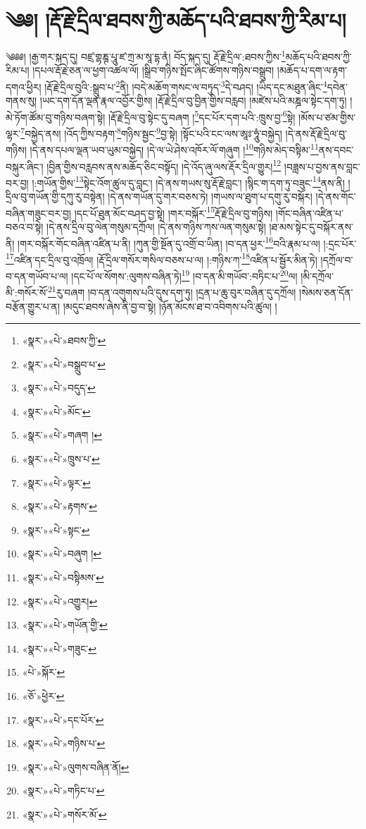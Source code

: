 \chapter{༄༅། །རྡོ་རྗེ་དྲིལ་ཐབས་ཀྱི་མཆོད་པའི་ཐབས་ཀྱི་རིམ་པ།}༄༅༅། །རྒྱ་གར་སྐད་དུ། བཛྲ་གྷཎྚ་པཱུ་ཛ་ཀྲ་མ་སཱ་དྷ་ནཾ། བོད་སྐད་དུ། རྡོ་རྗེ་དྲིལ་:ཐབས་ཀྱིས་\footnote{«སྣར་»«པེ་»ཐབས་ཀྱི་}མཆོད་པའི་ཐབས་ཀྱི་རིམ་པ། །དཔལ་རྡོ་རྗེ་ཅན་ལ་ཕྱག་འཚལ་ལོ། །སྒྲིབ་གཉིས་སྤོང་ཞིང་ཚོགས་གཉིས་བསྒྲུབ། །མཆོད་པ་དག་ལ་རྟག་དགའ་ཕྱིར། །རྡོ་རྗེ་དྲིལ་བུའི་:སྒྲུབ་པ་\footnote{«སྣར་»«པེ་»བསྒྲུབ་པ་}ནི། །བདེ་མཆོག་གསང་ལ་བཏུད་\footnote{«སྣར་»«པེ་»བདུད་}དེ་བཤད། །ཡིད་དང་མཐུན་ཞིང་\footnote{«སྣར་»«པེ་»མོང་}དབེན་གནས་སུ། །ཡང་དག་དོན་ལྡན་རྣལ་འབྱོར་གྱིས། །རྡོ་རྗེ་དྲིལ་བུ་བྱིན་གྱིས་བརླབ། །མཛེས་པའི་མཎྜལ་སྟེང་དག་ཏུ། །མེ་ཏོག་ཚོམ་བུ་གཉིས་བཞག་སྟེ། །རྡོ་རྗེ་དྲིལ་བུ་སྟེང་དུ་བཞག །\footnote{«སྣར་»«པེ་»གཞག །}དང་པོར་དག་པའི་:ཁྲུས་བྱ་\footnote{«སྣར་»«པེ་»ཁྲུས་པ་}སྟེ། །མོས་པ་ཙམ་གྱིས་ལྷར་\footnote{«སྣར་»«པེ་»ལྟར་}བསྐྱེད་ནས། །འོད་ཀྱིས་བརྟག་\footnote{«སྣར་»«པེ་»རྟགས་}གཉིས་སྦྱང་\footnote{«སྣར་»«པེ་»སྟང་}བྱ་སྟེ། །སྟོང་པའི་ངང་ལས་ཨཱཿ་ཧཱུཾ་བསྐྱེད། །དེ་ནས་རྡོ་རྗེ་དྲིལ་བུ་གཉིས། །དེ་ནས་དཔལ་ལྡན་ཡབ་ཡུམ་བསྐྱེད། །དེ་ལ་ཡེ་ཤེས་འཁོར་ལོ་གཞུག །\footnote{«སྣར་»«པེ་»བཞུག །}གཉིས་མེད་བསྟིམ་\footnote{«སྣར་»«པེ་»བསྟིམས་}ནས་དབང་བསྐུར་ཞིང་། །བྱིན་གྱིས་བརླབས་ནས་མཆོད་ཅིང་བསྟོད། །དེ་འོད་ཞུ་ལས་རྡོར་དྲིལ་གྱུར།\footnote{«སྣར་»«པེ་»འགྱུར།} །བཟླས་པ་བྱས་ནས་བླང་བར་བྱ། །:གཡོན་གྱིས་\footnote{«སྣར་»«པེ་»གཡོན་གྱི་}སྟེང་འོག་ཚུལ་དུ་བླང་། །དེ་ནས་གཡས་སུ་རྡོ་རྗེ་བླང་། །སྙིང་ག་དག་ཏུ་བཟུང་\footnote{«སྣར་»«པེ་»གཟུང་}ནས་ནི། །དྲིལ་བུ་གཡོན་གྱི་དཀུ་རུ་བསྟེན། །དེ་ནས་གཡོན་དུ་གར་བཅས་ཏེ། །གཡས་ལ་ཐུག་པ་དགུ་རུ་བསྐོར། །དེ་ནས་གོང་བཞིན་གཟུང་བར་བྱ། །དང་པོ་ཐུན་མོང་བཤད་བྱ་སྟེ། །གར་བསྐོར་\footnote{«པེ་»སྐོར་}རྡོ་རྗེ་དྲིལ་བུ་གཉིས། །གོང་བཞིན་འཛིན་པ་བཅའ་བ་སྟེ། །དེ་ནས་དྲིལ་བུ་ལེན་གསུམ་དཀྲོལ། །དེ་ནས་གཉིས་ཀས་ལན་གསུམ་སྟེ། །ཐ་མས་སྟེང་དུ་བསྐོར་ནས་ནི། །གར་བསྐོར་གོང་བཞིན་འཛིན་པ་ནི། །ཀུན་གྱི་སྔོན་དུ་འགྲོ་བ་ཡིན། །བ་དན་ཕྱར་\footnote{«ཅོ་»ཕྱེར་}བའི་རྣམ་པ་ལ། །:དྲང་པོར་\footnote{«སྣར་»«པེ་»དང་པོར་}འཛིན་དང་དྲིལ་བུ་འཁྲོལ། །རྡོ་དྲིལ་གསོར་གསིལ་བཅས་པ་ལ། །:གཉིས་ཀ་\footnote{«སྣར་»«པེ་»གཉིས་པ་}འཛིན་པ་སྦྱོར་མིན་ཏེ། །དཀྲོལ་བ་བ་དན་གཡོབ་པ་ལ། །དང་པོ་ལ་སོགས་:ལུགས་བཞིན་ཏེ།\footnote{«སྣར་»«པེ་»ལུགས་བཞིན་ནོ།} །བ་དན་མི་གཡོབ་:བཏིང་པ་\footnote{«སྣར་»«པེ་»གཏིང་པ་}ལ། །མི་དཀྲོལ་མི་:གསོར་སོ་\footnote{«སྣར་»«པེ་»གསོར་མོ་}རུ་བཞག །བ་དན་འགུགས་པའི་དུས་དག་ཏུ། །དྲན་པ་ཆུ་བུར་བཞིན་དུ་དཀྲོལ། །སེམས་ཅན་དོན་བརྩོན་གྱུར་པ་ན། །མདུང་ཐབས་ཞེས་ནི་བྱ་བ་སྟེ། །ཉོན་མོངས་ཐ་བ་འབིགས་པའི་ཚུལ། །
